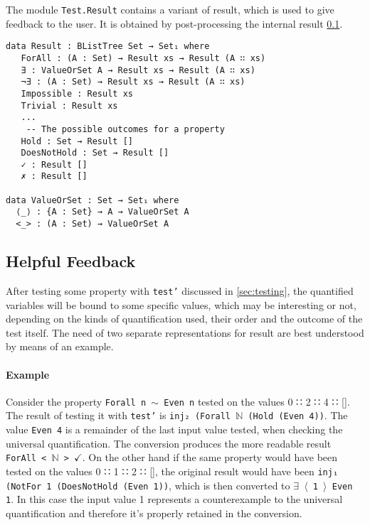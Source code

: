 \documentclass[10pt,a4paper]{article}
\begin{document}
The module \texttt{Test.Result} contains a variant of result, which is used to give feedback to the user. It is obtained by post-processing the internal result \ref{sec:HelpfulFeedback}.

\begin{verbatim}
data Result : BListTree Set → Set₁ where
   ForAll : (A : Set) → Result xs → Result (A ∷ xs)
   ∃ : ValueOrSet A → Result xs → Result (A ∷ xs)
   ¬∃ : (A : Set) → Result xs → Result (A ∷ xs)
   Impossible : Result xs
   Trivial : Result xs
   ...
    -- The possible outcomes for a property
   Hold : Set → Result []
   DoesNotHold : Set → Result []
   ✓ : Result []
   ✗ : Result []
   
data ValueOrSet : Set → Set₁ where
  ⟨_⟩ : {A : Set} → A → ValueOrSet A
  <_> : (A : Set) → ValueOrSet A

\end{verbatim}

\subsection{Helpful Feedback}
\label{sec:HelpfulFeedback}
After testing some property with \texttt{test'} discussed in \ref{sec:testing}, the quantified variables will be bound to some specific values, which may be interesting or not, depending on the kinds of quantification used, their order and the outcome of the test itself. 
The need of two separate representations for result are best understood by means of an example.

\paragraph{Example}
Consider the property \texttt{Forall n $\sim$ Even n} tested on the values 0 ∷ 2 ∷ 4 ∷ []. The result of testing it with \texttt{test'} is \texttt{\texttt{inj₂} (Forall $\mathbb{N}$ (Hold (Even 4))}. The value \texttt{Even 4} is a remainder of the last input value tested, when checking the universal quantification. The conversion produces the more readable result 
\texttt{ForAll < $\mathbb{N}$ > $\checkmark$}.
On the other hand if the same property would have been tested on the values 0 ∷ 1 ∷ 2 ∷ [], the original result would have been \texttt{\texttt{inj₁} (NotFor 1 (DoesNotHold (Even 1))}, which is then converted to \texttt{$\exists$ $\langle$ 1 $\rangle$ Even 1}. In this case the input value 1 represents a counterexample to the universal quantification and therefore it's properly retained in the conversion.
\end{document}

